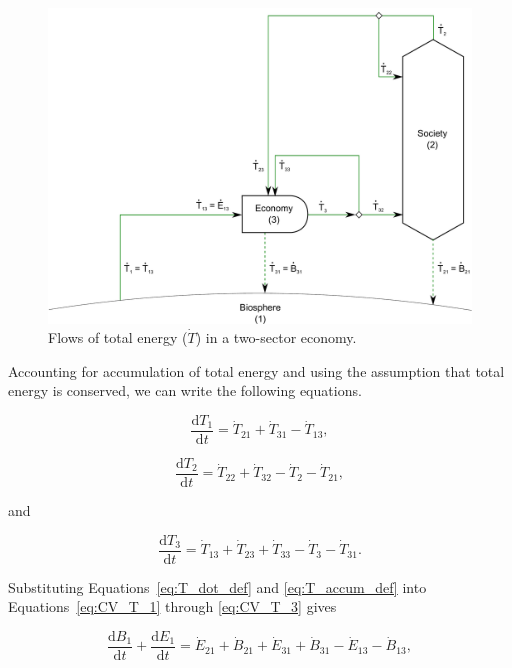 \begin{figure}[h!]
\includegraphics[width=0.9\linewidth]{Part_2/Chapter_Embodied/images/2_sector_embodied_energy.pdf}
\caption{Flows of total energy ($\dot{T}$) in a two-sector economy.}
\label{fig:B_total_energy}
\end{figure}

Accounting for accumulation of total energy and using the assumption 
that total energy is conserved, we can write the following equations.

\begin{equation} \label{eq:CV_T_1}
	\frac{\mathrm{d}T_{1}}{\mathrm{d}t} 	 
	= \dot{T}_{21} 
	+ \dot{T}_{31} 
	- \dot{T}_{13},
\end{equation}

\begin{equation} \label{eq:CV_T_2}
	\frac{\mathrm{d}T_{2}}{\mathrm{d}t} 	 
	= \dot{T}_{22}
	+ \dot{T}_{32} 
	- \dot{T}_2
	- \dot{T}_{21},
\end{equation}

\noindent and

\begin{equation} \label{eq:CV_T_3}
	\frac{\mathrm{d}T_{3}}{\mathrm{d}t} 	 
	= \dot{T}_{13} 
	+ \dot{T}_{23}
	+ \dot{T}_{33} 
	- \dot{T}_{3} 
	- \dot{T}_{31}.
\end{equation}

Substituting Equations~\ref{eq:T_dot_def} 
and \ref{eq:T_accum_def} into 
Equations~\ref{eq:CV_T_1} through
\ref{eq:CV_T_3} gives

\begin{equation} \label{eq:CV_dB_1}
	\frac{\mathrm{d}B_{1}}{\mathrm{d}t} 
	+ \frac{\mathrm{d}E_{1}}{\mathrm{d}t} 
	= \dot{E}_{21} 
	+ \dot{B}_{21} 
	+ \dot{E}_{31} 
	+ \dot{B}_{31} 
	- \dot{E}_{13} 
	- \dot{B}_{13},
\end{equation}

